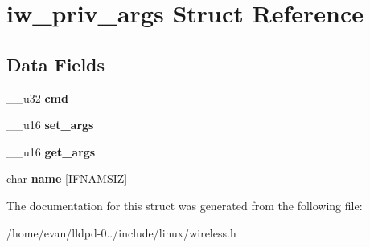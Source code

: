 \section{iw\-\_\-priv\-\_\-args \-Struct \-Reference}
\label{structiw__priv__args}
\subsection*{\-Data \-Fields}
\begin{DoxyCompactItemize}
\item 
\-\_\-\-\_\-u32 {\bfseries cmd}\label{structiw__priv__args_a66d231264d5aa36fd7d347e2c967769a}

\item 
\-\_\-\-\_\-u16 {\bfseries set\-\_\-args}\label{structiw__priv__args_ad6bf06b79330940e1da8026cea1d2c5c}

\item 
\-\_\-\-\_\-u16 {\bfseries get\-\_\-args}\label{structiw__priv__args_a97cf6e01a20b5eae5ea5d7398a4017d9}

\item 
char {\bfseries name} [\-I\-F\-N\-A\-M\-S\-I\-Z]\label{structiw__priv__args_a9ea12d6fc5b2c586092468ee1a86162a}

\end{DoxyCompactItemize}


\-The documentation for this struct was generated from the following file\-:\begin{DoxyCompactItemize}
\item 
/home/evan/lldpd-\/0../include/linux/wireless.\-h\end{DoxyCompactItemize}
